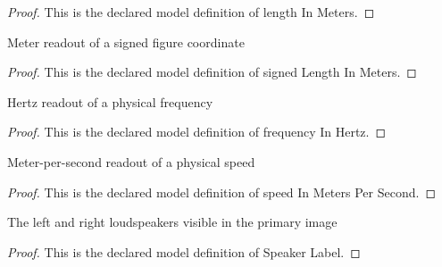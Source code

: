 \begin{proof}
  This is the declared model definition of length In Meters.
\end{proof}
\begin{definition}
  \label{def:physics:phyx-mini-0219:phyxminiproblems-problemphyxmini0219-signedlengthinmeters}
  Meter readout of a signed figure coordinate
\end{definition}
\begin{proof}
  This is the declared model definition of signed Length In Meters.
\end{proof}
\begin{definition}
  \label{def:physics:phyx-mini-0219:phyxminiproblems-problemphyxmini0219-frequencyinhertz}
  Hertz readout of a physical frequency
\end{definition}
\begin{proof}
  This is the declared model definition of frequency In Hertz.
\end{proof}
\begin{definition}
  \label{def:physics:phyx-mini-0219:phyxminiproblems-problemphyxmini0219-speedinmeterspersecond}
  Meter-per-second readout of a physical speed
\end{definition}
\begin{proof}
  This is the declared model definition of speed In Meters Per Second.
\end{proof}
\begin{definition}
  \label{def:physics:phyx-mini-0219:phyxminiproblems-problemphyxmini0219-speakerlabel}
  The left and right loudspeakers visible in the primary image
\end{definition}
\begin{proof}
  This is the declared model definition of Speaker Label.
\end{proof}

